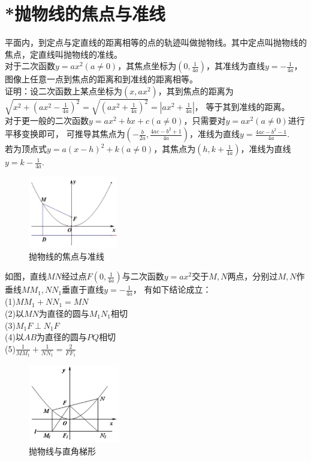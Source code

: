 \documentclass{ecnuthesis}
\begin{document}
\section{*抛物线的焦点与准线}
\begin{knowledge}
    平面内，到定点与定直线的距离相等的点的轨迹叫做抛物线。其中定点叫抛物线的焦点，定直线叫抛物线的准线。\\
    对于二次函数$y=ax^2(a\ne 0)$，其焦点坐标为$(0,\frac{1}{4a})$，其准线为直线$y=-\frac{1}{4a}$，图像上任意一点到焦点的距离和到准线的距离相等。\\
    证明：设二次函数上某点坐标为$(x,ax^2)$，其到焦点的距离为$\sqrt{x^2+(ax^2-\frac{1}{4a})^2}=\sqrt{(ax^2+\frac{1}{4a})^2}=|ax^2+\frac{1}{4a}|$，
    等于其到准线的距离。\\
    对于更一般的二次函数$y=ax^2+bx+c(a\ne 0)$，只需要对$y=ax^2(a\ne 0)$进行平移变换即可，
    可推导其焦点为$(-\frac{b}{2a},\frac{4ac-b^2+1}{4a})$，准线为直线$y=\frac{4ac-b^2-1}{4a}$. \\
    若为顶点式$y=a(x-h)^2+k(a \ne 0)$，其焦点为$(h,k+\frac{1}{4a})$，准线为直线$y=k-\frac{1}{4a}$. \\
\end{knowledge}
\begin{figure}[H]
\centering
\includegraphics[width=4cm]{picture/1003.png}
\caption{抛物线的焦点与准线}
\end{figure}
\begin{model}
    如图，直线$MN$经过点$F(0,\frac{1}{4a})$与二次函数$y=ax^2$交于$M,N$两点，分别过$M,N$作垂线$MM_1,NN_1$垂直于直线$y=-\frac{1}{4a}$，
    有如下结论成立：\\
    (1)$MM_1+NN_1=MN$ \\
    (2)以$MN$为直径的圆与$M_1N_1$相切 \\
    (3)$M_1F \perp N_1F$ \\
    (4)以$AB$为直径的圆与$PQ$相切 \\
    (5)$\frac{1}{MM_1}+\frac{1}{NN_1}=\frac{2}{FF_1}$
\end{model}
\begin{figure}[H]
\centering
\includegraphics[width=4cm]{picture/1004.png}
\caption{抛物线与直角梯形}
\end{figure}
\clearpage
\end{document}
